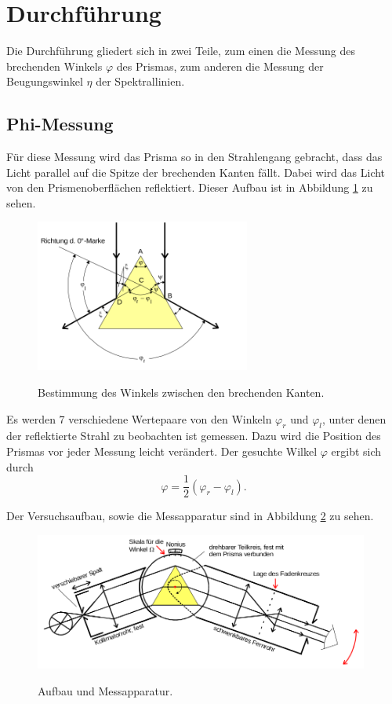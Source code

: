 \section{Durchführung}
\label{sec:Durchführung}
Die Durchführung gliedert sich in zwei Teile, zum einen die Messung
des brechenden Winkels $\varphi$ des Prismas, zum anderen die Messung
der Beugungswinkel $\eta$ der Spektrallinien.

\subsection{Phi-Messung}
Für diese Messung wird das Prisma so in den Strahlengang gebracht, dass
das Licht parallel auf die Spitze der brechenden Kanten fällt.
Dabei wird das Licht von den Prismenoberflächen reflektiert.
Dieser Aufbau ist in Abbildung \ref{fig:phi} zu sehen.

\begin{figure}[H]
  \centering
  \includegraphics[height=5cm]{dreh.png}
  \caption{Bestimmung des Winkels zwischen den brechenden Kanten.}
  \label{fig:phi}
  \cite{skript}
\end{figure}

Es werden 7 verschiedene Wertepaare von
den Winkeln $\varphi_r$ und $\varphi_l$, unter denen der reflektierte Strahl zu beobachten ist
gemessen. Dazu wird die Position des Prismas vor jeder Messung leicht
verändert.
Der gesuchte Wilkel $\varphi$ ergibt sich durch
\begin{equation}
  \varphi=\frac{1}{2}(\varphi_r-\varphi_l).
  \label{eqn:phi}
\end{equation}

Der Versuchsaufbau, sowie die Messapparatur sind in Abbildung
\ref{fig:aufbau} zu sehen.

\begin{figure}
  \centering
  \includegraphics[width=11cm]{aufbau.png}
  \caption{Aufbau und Messapparatur.}
  \label{fig:aufbau}
  \cite{skript}
\end{figure}

